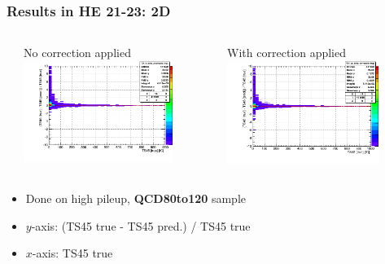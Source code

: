 \documentclass[bigger]{beamer}
\providecommand{\alert}[1]{\textbf{#1}}
\begin{document}
\begin{frame}
\frametitle{Results in HE 21-23: 2D}
\label{sec-3-3-9}
\begin{columns} %
\label{sec-3-3-9-1}
\begin{column}{0.55\textwidth}
\label{sec-3-3-9-1-1}

\centering
No correction applied
\includegraphics[width=0.8\textwidth]{fig/delta_uncorrected_QCD80to120_ring_2.png}
\end{column}
\begin{column}{0.55\textwidth}
\label{sec-3-3-9-1-2}

\centering
With correction applied
\includegraphics[width=0.8\textwidth]{fig/delta_corrected_QCD80to120_ring_2.png}
\end{column}
\end{columns}
\label{sec-3-3-9-2}
\begin{itemize}

\item Done on high pileup, \alert{QCD80to120} sample
\label{sec-3-3-9-2-1}%

\item $y$-axis: (TS45 true - TS45 pred.) / TS45 true
\label{sec-3-3-9-2-2}%

\item $x$-axis: TS45 true
\label{sec-3-3-9-2-3}%

\end{itemize} %
\end{frame}
\end{document}
